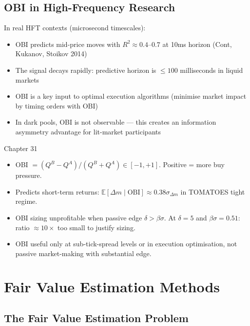 \documentclass[12pt,a4paper,openany]{report}
\theoremstyle{definition}
\newcommand{\E}{\mathbb{E}}
\begin{document}
\section{OBI in High-Frequency Research}

In real HFT contexts (microsecond timescales):
\begin{itemize}
  \item OBI predicts mid-price moves with $R^2 \approx 0.4$--$0.7$ at 10ms horizon (Cont, Kukanov, Stoikov 2014)
  \item The signal decays rapidly: predictive horizon is $\leq 100$ milliseconds in liquid markets
  \item OBI is a key input to optimal execution algorithms (minimise market impact by timing orders with OBI)
  \item In dark pools, OBI is not observable — this creates an information asymmetry advantage for lit-market participants
\end{itemize}

\begin{takeawaybox}{Chapter 31}
\begin{itemize}
  \item OBI $= (Q^B - Q^A)/(Q^B + Q^A) \in [-1, +1]$. Positive = more buy pressure.
  \item Predicts short-term returns: $\E[\Delta m \mid \text{OBI}] \approx 0.38\sigma_{\Delta m}$ in TOMATOES tight regime.
  \item OBI sizing unprofitable when passive edge $\delta > \beta\sigma$. At $\delta = 5$ and $\beta\sigma = 0.51$: ratio $\approx 10\times$ too small to justify sizing.
  \item OBI useful only at sub-tick-spread levels or in execution optimisation, not passive market-making with substantial edge.
\end{itemize}
\end{takeawaybox}


\chapter{Fair Value Estimation Methods}

\section{The Fair Value Estimation Problem}
\end{document}
